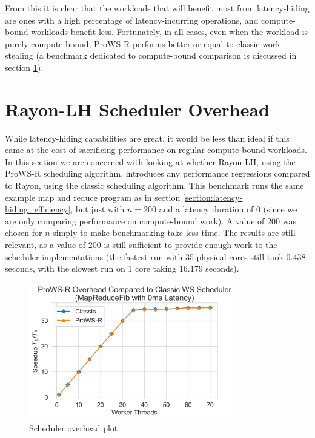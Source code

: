 \documentclass[bsc,frontabs,singlespacing,parskip,deptreport,normalheadings]{infthesis}
\begin{document}
From this it is clear that the workloads that will benefit most from
latency-hiding are ones with a high percentage of latency-incurring operations,
and compute-bound workloads benefit less. Fortunately, in all cases, even when
the workload is purely compute-bound, ProWS-R performs better or equal to
classic work-stealing (a benchmark dedicated to compute-bound comparison is
discussed in section \ref{section:rayon-lh_scheduler_overhead}).

\section{Rayon-LH Scheduler Overhead}
\label{section:rayon-lh_scheduler_overhead}

While latency-hiding capabilities are great, it would be less than ideal if this
came at the cost of sacrificing performance on regular compute-bound workloads.
In this section we are concerned with looking at whether Rayon-LH, using the
ProWS-R scheduling algorithm, introduces any performance regressions compared to
Rayon, using the classic scheduling algorithm. This benchmark runs the same
example map and reduce program as in section
\ref{section:latency-hiding_efficiency}, but just with \(n = 200\) and a latency
duration of 0 (since we are only comparing performance on compute-bound work). A
value of 200 was chosen for \(n\) simply to make benchmarking take less time.
The results are still relevant, as a value of 200 is still sufficient to provide
enough work to the scheduler implementations (the fastest run with 35 physical
cores still took 0.438 seconds, with the slowest run on 1 core taking 16.179
seconds).

\begin{figure}[ht]
    \centering
    \includegraphics[width=0.8\textwidth]{figures/overhead_plot.png}
    \caption{Scheduler overhead plot}
    \label{fig:overhead}
\end{figure}
\end{document}
